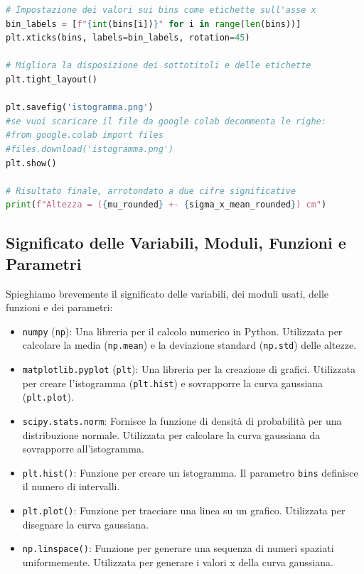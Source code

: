 \begin{lstlisting}[language=Python, caption={Script Python per calcolare e visualizzare le altezze}]
# Impostazione dei valori sui bins come etichette sull'asse x
bin_labels = [f"{int(bins[i])}" for i in range(len(bins))]
plt.xticks(bins, labels=bin_labels, rotation=45)

# Migliora la disposizione dei sottotitoli e delle etichette
plt.tight_layout()

plt.savefig('istogramma.png')
#se vuoi scaricare il file da google colab decommenta le righe:
#from google.colab import files
#files.download('istogramma.png')
plt.show()

# Risultato finale, arrotondato a due cifre significative
print(f"Altezza = ({mu_rounded} +- {sigma_x_mean_rounded}) cm")
\end{lstlisting}

\subsection{Significato delle Variabili, Moduli, Funzioni e Parametri}
Spieghiamo brevemente il significato delle variabili, dei moduli usati, delle funzioni e dei parametri:

\begin{itemize}
    \item \texttt{numpy} (\texttt{np}): Una libreria per il calcolo numerico in Python. Utilizzata per calcolare la media (\texttt{np.mean}) e la deviazione standard (\texttt{np.std}) delle altezze.
    \item \texttt{matplotlib.pyplot} (\texttt{plt}): Una libreria per la creazione di grafici. Utilizzata per creare l'istogramma (\texttt{plt.hist}) e sovrapporre la curva gaussiana (\texttt{plt.plot}).
    \item \texttt{scipy.stats.norm}: Fornisce la funzione di densità di probabilità per una distribuzione normale. Utilizzata per calcolare la curva gaussiana da sovrapporre all'istogramma.
    \item \texttt{plt.hist()}: Funzione per creare un istogramma. Il parametro \texttt{bins} definisce il numero di intervalli.
    \item \texttt{plt.plot()}: Funzione per tracciare una linea su un grafico. Utilizzata per disegnare la curva gaussiana.
    \item \texttt{np.linspace()}: Funzione per generare una sequenza di numeri spaziati uniformemente. Utilizzata per generare i valori x della curva gaussiana.
\end{itemize}

